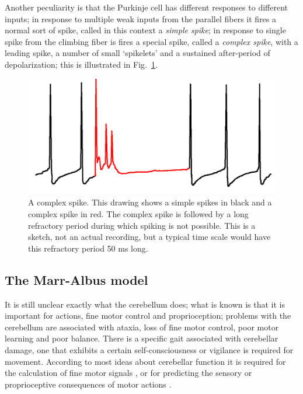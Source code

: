 \documentclass[11pt,a4paper]{scrartcl}
\begin{document}
Another peculiarity is that the Purkinje cell has different responses to different inputs; in response to multiple weak inputs from the parallel fibers it fires a normal sort of spike, called in this context a \textsl{simple spike}; in response to single spike from the climbing fiber is fires a special spike, called a \textsl{complex spike}, with a leading spike, a number of small \lq{}spikelets\rq{} and a sustained after-period of depolarization; this is illustrated in Fig.~\ref{fig:spikes}.

\begin{figure}
\begin{center}
\includegraphics[width=8.cm]{complex_spike.png}
\end{center}
\caption{A complex spike. This drawing shows a simple
spikes in black and a complex spike in red. The
complex spike is followed by a long refractory
period during which spiking is not possible. This is
a sketch, not an actual recording, but a typical time
scale would have this refractory period 50 ms long.\label{fig:spikes}} 
\end{figure}

\subsection*{The Marr-Albus model}

It is still unclear exactly what the cerebellum does; what is known is
that it is important for actions, fine motor control and
proprioception; problems with the cerebellum are associated with
ataxia, loss of fine motor control, poor motor learning and poor
balance. There is a specific gait associated with cerebellar damage,
one that exhibits a certain self-consciousness or vigilance is
required for movement. According to most ideas about cerebellar
function it is required for the calculation of fine motor signals
\cite{Albus1971a}, or for predicting the sensory or proprioceptive
consequences of motor actions \cite{GaoEtAl1996a}.
\end{document}
